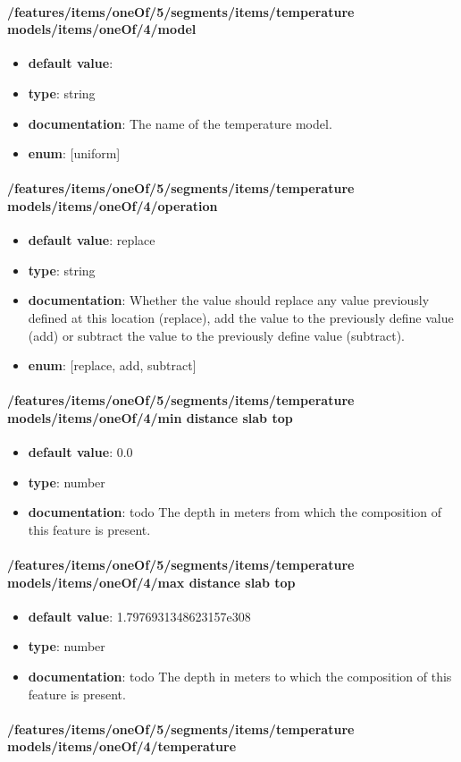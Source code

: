 \paragraph{/features/items/oneOf/5/segments/items/temperature models/items/oneOf/4/model}
\begin{itemize}\item {\bf default value}: 
\item {\bf type}: string
\item {\bf documentation}: The name of the temperature model.
\item {\bf enum}: [uniform]\end{itemize}\paragraph{/features/items/oneOf/5/segments/items/temperature models/items/oneOf/4/operation}
\begin{itemize}\item {\bf default value}: replace
\item {\bf type}: string
\item {\bf documentation}: Whether the value should replace any value previously defined at this location (replace), add the value to the previously define value (add) or subtract the value to the previously define value (subtract).
\item {\bf enum}: [replace, add, subtract]\end{itemize}\paragraph{/features/items/oneOf/5/segments/items/temperature models/items/oneOf/4/min distance slab top}
\begin{itemize}\item {\bf default value}: 0.0
\item {\bf type}: number
\item {\bf documentation}: todo The depth in meters from which the composition of this feature is present.
\end{itemize}\paragraph{/features/items/oneOf/5/segments/items/temperature models/items/oneOf/4/max distance slab top}
\begin{itemize}\item {\bf default value}: 1.7976931348623157e308
\item {\bf type}: number
\item {\bf documentation}: todo The depth in meters to which the composition of this feature is present.
\end{itemize}\paragraph{/features/items/oneOf/5/segments/items/temperature models/items/oneOf/4/temperature}
